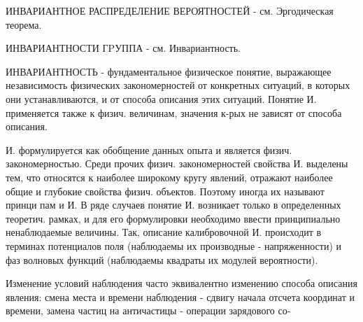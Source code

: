 \documentclass[10pt]{article}
\begin{document}
ИНВАРИАНТНОЕ РАСПРЕДЕЛЕНИЕ ВЕРОЯТНОСТЕЙ - см. Эргодическая теорема.



ИНВАРИАНТНОСТИ ГPУППА - см. Инвариантность.



ИНВАРИАНТНОСТЬ - фундаментальное физическое понятие, выражающее независимость физических закономерностей от конкретных ситуаций, в которых они устанавливаются, и от способа описания этих ситуаций. Понятие И. применяется также к физич. величинам, значения к-рых не зависят от способа описания.



И. формулируется как обобщение данных опыта и является физич. закономерностью. Среди прочих физич. закономерностей свойства И. выделены тем, что относятся к наиболее широкому кругу явлений, отражают наиболее общие и глубокие свойства физич. объектов. Поэтому иногда их называют принци пам и И. В ряде случаев понятие И. возникает только в определенных теоретич. рамках, и для его формулировки необходимо ввести принципиально ненаблюдаемые величины. Так, описание калибровочной И. происходит в терминах потенциалов поля (наблюдаемы их производные - напряженности) и фаз волновых функций (наблюдаемы квадраты их модулей вероятности).



Изменение условий наблюдения часто эквивалентно изменению способа описания явления: смена места и времени наблюдения - сдвигу начала отсчета координат и времени, замена частиц на античастицы - операции зарядового со-
\end{document}
